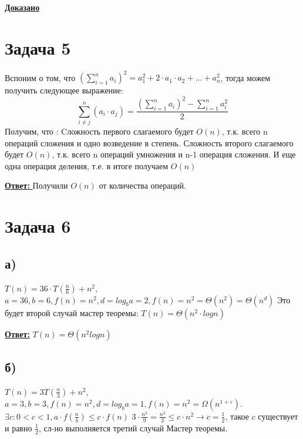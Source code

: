 \documentclass[a4paper,14pt]{article} %
\begin{document}
\underline{\textbf{Доказано}}

\section{Задача 5}
Вспоним о том, что $(\sum_{i=1}^n a_i)^2 = a_1^2+2\cdot a_1 \cdot a_2 + ... + a_n^2$, тогда можем получить следующее выражение:
\begin{equation*}
	\sum_{i \not= j}^n(a_i \cdot a_j) = \frac{(\sum_{i=1}^n a_i)^2 - \sum_{i=1}^n a_i^2 }{2}
\end{equation*}
Получим, что :
\newline
Cложность первого слагаемого будет $O(n)$, т.к. всего n операций сложения и одно возведение в степень.
\newline
Сложность второго слагаемого будет $O(n)$, т.к. всего n операций умножения и n-1 операция сложения.
\newline
И еще одна операция деления, т.е. в итоге получаем $O(n)$

\underline{\textbf{Ответ: }} Получили $O(n)$ от количества операций.

\section{Задача 6}
\subsection{а)}
$T(n) = 36 \cdot T(\frac{n}{6}) + n^2$,   
\newline
$a = 36, b = 6, f(n) = n^2, d = log_b a = 2, f(n) = n^2 =\Theta(n^{2}) = \Theta(n^d)$
\newline
Это будет второй случай мастер теоремы: $T(n) = \Theta(n^2 \cdot logn)$

\underline{\textbf{Ответ:}} $T(n) = \Theta(n^2 logn)$

\subsection{б)}
$T(n) = 3 T(\frac{n}{3}) + n^2$,
\newline
$a = 3, b = 3, f(n) = n^2, d = log_b a = 1, f(n) = n^2 = \Omega(n^{1 + \varepsilon})$.
\newline
$\exists c : 0 < c < 1, a \cdot f(\frac{n}{b}) \leq c \cdot f(n)$
\newline
$3 \cdot \frac{n^2}{9} = \frac{n^2}{3} \leq c \cdot n^2 \longrightarrow c = \frac{1}{2}$, такое $c$ существует и равно $\frac{1}{2}$, сл-но выполняется третий случай Мастер теоремы.
\end{document}
